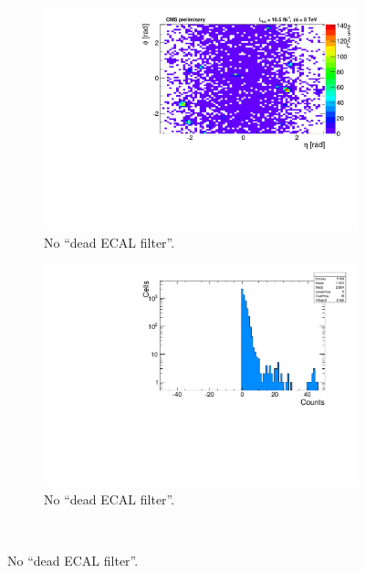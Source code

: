 \begin{figure}[h!]
  \begin{center}
    \begin{subfigure}[b]{0.46\textwidth}
      \includegraphics[width=\textwidth]{Figs/dphi/HT_dependent_AlphaT_thresholds/th2d_denom_summed_ge2j_ge0b_200.pdf}
      \caption{No ``dead ECAL filter''.}
      \label{fig:hotspots_2d_nodeadECAL}
    \end{subfigure}
    \begin{subfigure}[b]{0.46\textwidth}
      \includegraphics[width=\textwidth]{Figs/dphi/HT_dependent_AlphaT_thresholds/th1d_denom_summed_ge2j_ge0b_200.pdf}
      \caption{No ``dead ECAL filter''.}
      \label{fig:hotspots_1d_nodeadECAL}
    \end{subfigure} \\ 

\end{center}
\end{figure}
